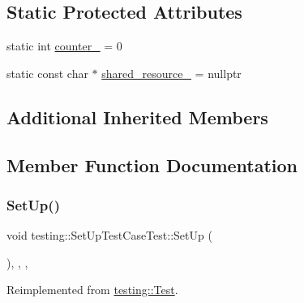 \subsection*{Static Protected Attributes}
\begin{DoxyCompactItemize}
\item 
static int \mbox{\hyperlink{classtesting_1_1_set_up_test_case_test_a5b6e811128d35389be49f6569bf93817}{counter\+\_\+}} = 0
\item 
static const char $\ast$ \mbox{\hyperlink{classtesting_1_1_set_up_test_case_test_a904e77fd9a628b6a9aca0280665fd040}{shared\+\_\+resource\+\_\+}} = nullptr
\end{DoxyCompactItemize}
\subsection*{Additional Inherited Members}


\subsection{Member Function Documentation}
\mbox{\label{classtesting_1_1_set_up_test_case_test_a5ceda206e569e436d71b2084333d23b1}} 
\subsubsection{\texorpdfstring{SetUp()}{SetUp()}\hspace{0.1cm}{\footnotesize\ttfamily [1/3]}}
{\footnotesize\ttfamily void testing\+::\+Set\+Up\+Test\+Case\+Test\+::\+Set\+Up (\begin{DoxyParamCaption}{ }\end{DoxyParamCaption})\hspace{0.3cm}{\ttfamily [inline]}, {\ttfamily [override]}, {\ttfamily [protected]}, {\ttfamily [virtual]}}



Reimplemented from \mbox{\hyperlink{classtesting_1_1_test_a190315150c303ddf801313fd1a777733}{testing\+::\+Test}}.

\mbox{\label{classtesting_1_1_set_up_test_case_test_a5ceda206e569e436d71b2084333d23b1}} 
